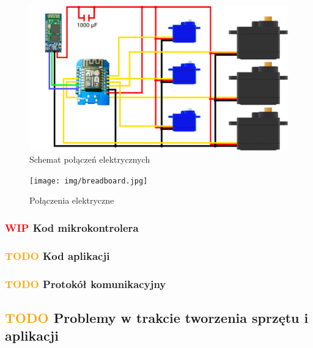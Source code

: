 \documentclass[11pt,titlepage,a4paper]{article}
\begin{document}
\vspace{5cm}

\begin{figure}[h!]
    \begin{center}
        \includegraphics[width=\textwidth]{img/schemat.png}
    \end{center}
    \caption{Schemat połączeń elektrycznych}
    \vspace{4cm}
    \label{SchematElektryczny}
\end{figure}

\begin{figure}[h!]
    \begin{center}
        \texttt{[image: img/breadboard.jpg]}
    \end{center}
    \caption{Połączenia elektryczne}
    \label{Breadboard}
\end{figure}

\subsubsection{\textcolor{red}{WIP} Kod mikrokontrolera}



\subsubsection{\textcolor{orange}{TODO} Kod aplikacji}
\subsubsection{\textcolor{orange}{TODO} Protokół komunikacyjny}

\subsection{\textcolor{orange}{TODO} Problemy w trakcie tworzenia sprzętu i aplikacji}
\end{document}

